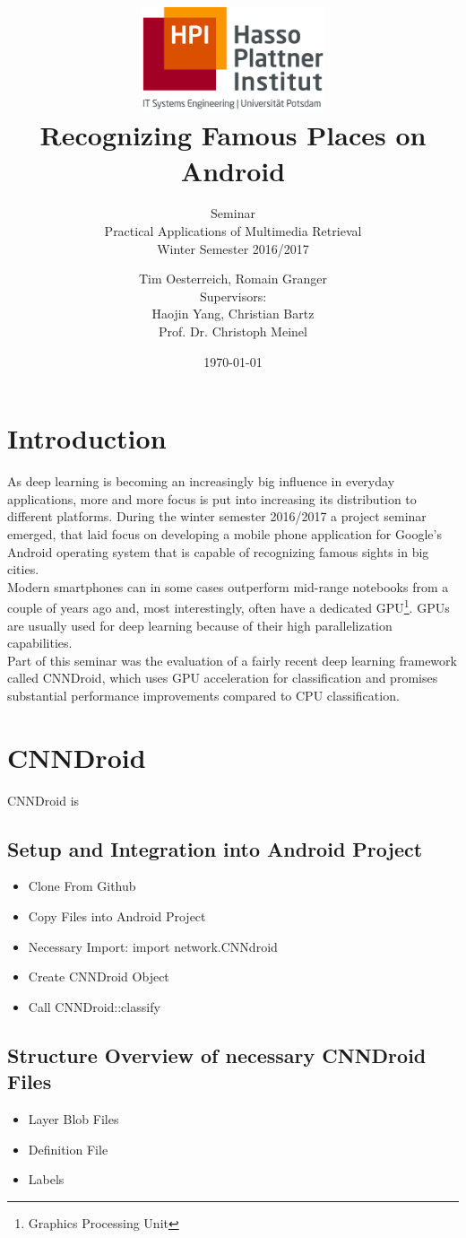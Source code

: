\documentclass[a4paper,12pt,pagesize,headsepline,bibtotoc,titlepage]{scrartcl}
\title{
    \includegraphics*[width=0.4\textwidth]{hpi_logo.png}\\
    \vspace{24pt}
    Recognizing Famous Places on Android
}
\subtitle{
    Seminar\\
    Practical Applications of Multimedia Retrieval\\
    Winter Semester 2016/2017
}
\author{
    Tim Oesterreich, Romain Granger\\[12pt]
    Supervisors:\\
    Haojin Yang, Christian Bartz\\
    Prof. Dr. Christoph Meinel
}
\date{\today}
\begin{document}
\maketitle
\tableofcontents
\newpage

\section{Introduction}
As deep learning is becoming an increasingly big influence in everyday applications, more and more focus is put into increasing its distribution to different platforms. During the winter semester 2016/2017 a project seminar emerged, that laid focus on developing a mobile phone application for Google's Android operating system that is capable of recognizing famous sights in big cities.\\
Modern smartphones can in some cases outperform mid-range notebooks from a couple of years ago and, most interestingly, often have a dedicated GPU\footnote{Graphics Processing Unit}. GPUs are usually used for deep learning because of their high parallelization capabilities.\\
Part of this seminar was the evaluation of a fairly recent deep learning framework called CNNDroid, which uses GPU acceleration for classification and promises substantial performance improvements compared to CPU classification.

\section{CNNDroid}
CNNDroid is

\subsection{Setup and Integration into Android Project}
\begin{itemize}
    \item{Clone From Github}
    \item{Copy Files into Android Project}
    \item{Necessary Import: import network.CNNdroid}
    \item{Create CNNDroid Object}
    \item{Call CNNDroid::classify}
\end{itemize}

\subsection{Structure Overview of necessary CNNDroid Files}
\begin{itemize}
    \item{Layer Blob Files}
    \item{Definition File}
    \item{Labels}
\end{itemize}
\end{document}
